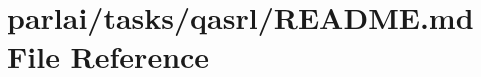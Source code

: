 \hypertarget{parlai_2tasks_2qasrl_2README_8md}{}\section{parlai/tasks/qasrl/\+R\+E\+A\+D\+ME.md File Reference}
\label{parlai_2tasks_2qasrl_2README_8md}
